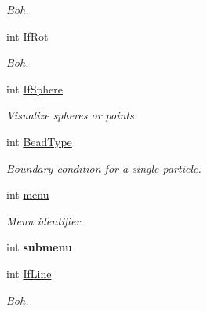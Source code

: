 \begin{DoxyCompactItemize}
\begin{DoxyCompactList}\small\item\em Boh. \end{DoxyCompactList}\item 
int \hyperlink{classForces_a2c1a353b3d35ac1fdcc12aca81f6bb9d}{If\+Rot}\hypertarget{classForces_a2c1a353b3d35ac1fdcc12aca81f6bb9d}{}\label{classForces_a2c1a353b3d35ac1fdcc12aca81f6bb9d}

\begin{DoxyCompactList}\small\item\em Boh. \end{DoxyCompactList}\item 
int \hyperlink{classForces_a49498134a2a543fdb43ec67e5dca8e37}{If\+Sphere}\hypertarget{classForces_a49498134a2a543fdb43ec67e5dca8e37}{}\label{classForces_a49498134a2a543fdb43ec67e5dca8e37}

\begin{DoxyCompactList}\small\item\em Visualize spheres or points. \end{DoxyCompactList}\item 
int \hyperlink{classForces_a06476a36da66d85ccb8de14d0275474d}{Bead\+Type}\hypertarget{classForces_a06476a36da66d85ccb8de14d0275474d}{}\label{classForces_a06476a36da66d85ccb8de14d0275474d}

\begin{DoxyCompactList}\small\item\em Boundary condition for a single particle. \end{DoxyCompactList}\item 
int \hyperlink{classForces_a26b42906c0869d0cef7431a39a162950}{menu}\hypertarget{classForces_a26b42906c0869d0cef7431a39a162950}{}\label{classForces_a26b42906c0869d0cef7431a39a162950}

\begin{DoxyCompactList}\small\item\em Menu identifier. \end{DoxyCompactList}\item 
int {\bfseries submenu}\hypertarget{classForces_af6060165f2c5013a4339818e9c08833d}{}\label{classForces_af6060165f2c5013a4339818e9c08833d}

\item 
int \hyperlink{classForces_ac3e70209b515c8a6293fcdb019a2fb29}{If\+Line}\hypertarget{classForces_ac3e70209b515c8a6293fcdb019a2fb29}{}\label{classForces_ac3e70209b515c8a6293fcdb019a2fb29}

\begin{DoxyCompactList}\small\item\em Boh. \end{DoxyCompactList}\end{DoxyCompactItemize}


